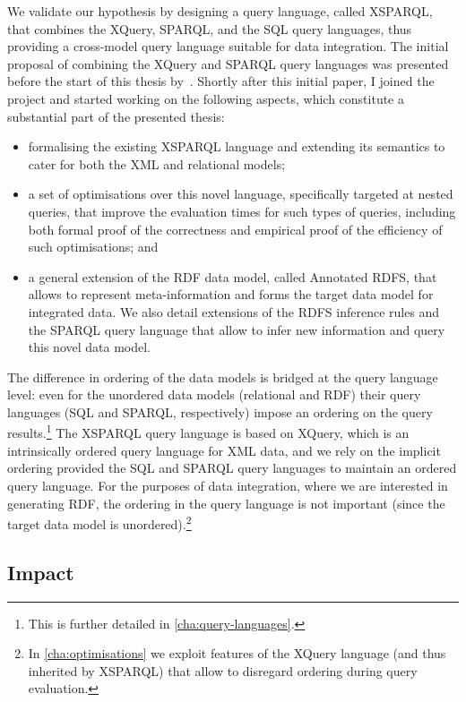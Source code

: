 %
We validate our hypothesis by designing a query language, called XSPARQL, that combines the XQuery, SPARQL, and the
\ac{SQL} query languages, thus providing a cross-model query language suitable for data integration.
%
The initial proposal of combining the XQuery and SPARQL query languages was presented before the start of this thesis
by~\citet{AkhtarKopeckyKrennwallner:2008aa}.  
%
Shortly after this initial paper, I joined the project and started working on the following aspects, which constitute a
substantial part of the presented thesis:
\begin{itemize}[noitemsep]
\item formalising the existing XSPARQL language and extending its semantics to cater for both the \ac{XML} and
  relational models;
\item a set of optimisations over this novel language, specifically targeted at nested queries, that improve the
  evaluation times for such types of queries, including both formal proof of the correctness and empirical proof of the
  efficiency of such optimisations; and
\item a general extension of the \ac{RDF} data model, called Annotated RDFS, that allows to represent meta-information
  and forms the target data model for integrated data.
  We also detail extensions of the \ac{RDFS} inference rules and the SPARQL query language that allow to infer new
  information and query this novel data model.
\end{itemize}
%
The difference in ordering of the data models is bridged at the query language level: even for the unordered data models
(relational and \ac{RDF}) their query languages (\ac{SQL} and SPARQL, respectively) impose an ordering on the query
results.\footnote{This is further detailed in \cref{cha:query-languages}.}
%
The XSPARQL query language is based on XQuery, which is an intrinsically ordered query language for \ac{XML} data, and 
%
we rely on the implicit ordering provided the \ac{SQL} and SPARQL query languages to maintain an ordered query language.
%
For the purposes of data integration, where we are interested in generating \ac{RDF}, the ordering in the query language
is not important (since the target data model is unordered).\footnote{In \cref{cha:optimisations} we exploit features of
  the XQuery language (and thus inherited by XSPARQL) that allow to disregard ordering during query evaluation.}

\subsection{Impact}
\label{sec:scientific-contributions}


